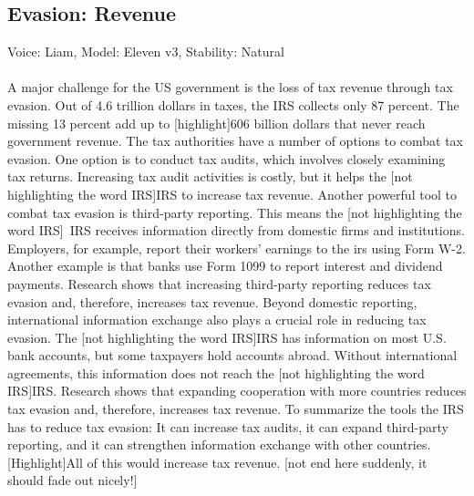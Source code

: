 \documentclass[11pt]{article}
\begin{document}
\subsection{Evasion: Revenue}
Voice: Liam,
Model: Eleven v3,
Stability: Natural\\\\
A major challenge for the US government is the loss of tax revenue through tax evasion. Out of 4.6 trillion dollars in taxes, the IRS collects only 87 percent. The missing 13 percent add up to [highlight]606 billion dollars that never reach government revenue. 
The tax authorities have a number of options to combat tax evasion. One option is to conduct tax audits, which involves closely examining tax returns. Increasing tax audit activities is costly, but it helps the [not highlighting the word IRS]IRS to increase tax revenue.
Another powerful tool to combat tax evasion is third-party reporting. This means the [not highlighting the word IRS] IRS receives information directly from domestic firms and institutions. Employers, for example, report their workers’ earnings to the irs using Form W-2. Another example is that banks use Form 1099 to report interest and dividend payments. 
Research shows that increasing third-party reporting reduces tax evasion and, therefore, increases tax revenue.
Beyond domestic reporting, international information exchange also plays a crucial role in reducing tax evasion. The [not highlighting the word IRS]IRS has information on most U.S. bank accounts, but some taxpayers hold accounts abroad. Without international agreements, this information does not reach the [not highlighting the word IRS]IRS. Research shows that expanding cooperation with more countries reduces tax evasion and, therefore, increases tax revenue.
To summarize the tools the IRS has to reduce tax evasion: It can increase tax audits, it can expand third-party reporting, and it can strengthen information exchange with other countries. [Highlight]All of this would increase tax revenue. [not end here suddenly, it should fade out nicely!]
\end{document}
